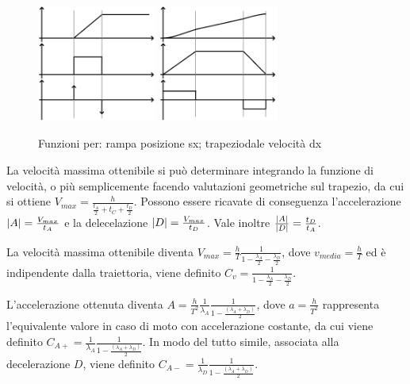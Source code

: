 \begin{figure}[h]
    \centering
    \includegraphics[width=0.35\textwidth]{Immagini/rampa_pos.png}
    \includegraphics[width=0.35\textwidth]{Immagini/trapezoidale_vel.png}
    \caption{Funzioni per: rampa posizione sx; trapeziodale velocità dx}
\end{figure}

La velocità massima ottenibile si può determinare integrando la funzione di velocità, o più semplicemente facendo valutazioni geometriche sul trapezio, da cui si ottiene \(V_{max} = \frac{h}{\frac{t_A}{2}+t_C +\frac{t_D}{2}}\).
Possono essere ricavate di conseguenza l'accelerazione \(\left|A\right| = \frac{V_{max}}{t_A}\) e la delecelazione \(\left|D\right| = \frac{V_{max}}{t_D}\). Vale inoltre \(\frac{\left|A\right|}{\left|D\right|} = \frac{t_D}{t_A}\).

La velocità massima ottenibile diventa \(V_{max} = \frac{h}{T} \frac{1}{1-\frac{\lambda_A}{2}-\frac{\lambda_D}{2}}\), dove \(v_{media} = \frac{h}{T}\) ed è indipendente dalla traiettoria, viene definito \(C_v = \frac{1}{1-\frac{\lambda_A}{2}-\frac{\lambda_D}{2}}\).

L'accelerazione ottenuta diventa \(A=\frac{h}{T^2} \frac{1}{\lambda_A}\frac{1}{1-\frac{\left(\lambda_A + \lambda_D \right)}{2}}\), dove \(a = \frac{h}{T^2}\) rappresenta l'equivalente valore in caso di moto con accelerazione costante, da cui viene definito \(C_{A+} = \frac{1}{\lambda_A}\frac{1}{1-\frac{\left(\lambda_A + \lambda_D \right)}{2}}\).
In modo del tutto simile, associata alla decelerazione \(D\), viene definito \(C_{A-} = \frac{1}{\lambda_D}\frac{1}{1-\frac{\left(\lambda_A + \lambda_D \right)}{2}}\).

